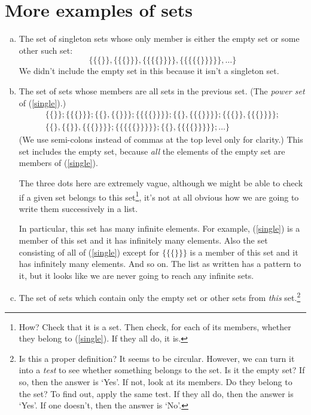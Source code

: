 \chapter{More examples of sets}
\label{more-examples}

\begin{enumerate}[(a)]
\item\label{single}
The set of singleton sets whose only member is either the empty set or some other such set:
\[ \{ \{\{\}\}, \{\{\{\}\}\}, \{\{\{\{\}\}\}\}, \{\{\{\{\{\}\}\}\}\},\ldots\}\]
We didn't include the empty set in this because it isn't a singleton set.
\item\label{powersing}
The set of sets whose members are all sets in the previous set. (The \emph{power set} of (\ref{single}).)
\begin{align*}
\{\{\}\}; \{\{\{\}\}\}; \{\{\}, \{\{\}\}\}; \{\{\{\{\}\}\}\}; \{\{\}, \{\{\{\}\}\}\}; \{\{\{\}\}, \{\{\{\}\}\}\}; \\
\{\{\}, \{\{\}\}, \{\{\{\}\}\}\}; \{\{\{\{\{\}\}\}\}\}; \{\{\}, \{\{\{\{\}\}\}\}\}; \ldots \}
\end{align*}
(We use semi-colons instead of commas at the top level only for clarity.)
This set includes the empty set, because \emph{all} the elements of the empty set are members of (\ref{single}).

The three dots here are extremely vague, although we might be able to check if a given set belongs to this set\footnote{How? Check that it is a set. Then check, for each of its members, whether they belong to (\ref{single}). If they all do, it is.}, it's not at all obvious how we are going to write them successively in a list.

In particular, this set has many infinite elements. For example, (\ref{single}) is a member of this set and it has infinitely many elements. Also the set consisting of all of (\ref{single}) except for $\{\{\{\}\}\}$ is a member of this set and it has infinitely many elements. And so on. The list as written has a pattern to it, but it looks like we are never going to reach any infinite sets.
\item\label{poww}
The set of sets which contain only the empty set or other sets from \emph{this} set.\footnote{Is this a proper definition? It seems to be circular. However, we can turn it into a \emph{test} to see whether something belongs to the set. Is it the empty set? If so, then the answer is `Yes'. If not, look at its members. Do they belong to the set? To find out, apply the same test. If they all do, then the answer is `Yes'. If one doesn't, then the answer is `No'.}


\end{enumerate}
